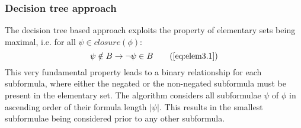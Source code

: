\subsubsection{Decision tree approach}\label{sec:methods-dt}
The decision tree based approach exploits the property of elementary sets being maximal, i.e. for all $\psi \in closure(\phi)$:
\begin{equation*}
  \psi \notin B \imply \lnot \psi \in B \tag{\autoref{eq:elem3.1}}
\end{equation*}
This very fundamental property leads to a binary relationship for each subformula, where either the negated or the non-negated subformula must be present in the elementary set. The algorithm considers all subformulae $\psi$ of $\phi$ in ascending order of their formula length $|\psi|$. This results in the smallest subformulae being considered prior to any other subformula.


